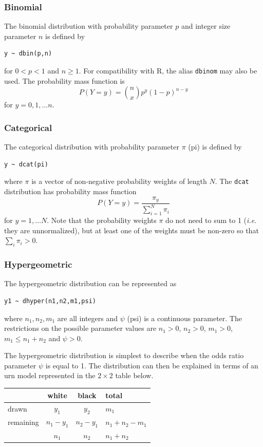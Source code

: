 \documentclass[11pt, a4paper, titlepage]{report}
\begin{document}
\subsubsection{Binomial}
\label{bugs:dbin}

The binomial distribution with probability parameter $p$ and integer
size parameter $n$ is defined by
\begin{verbatim}
y ~ dbin(p,n)
\end{verbatim}
for $0 < p < 1$ and $n \geq 1$. For compatibility with R, the alias
\texttt{dbinom} may also be used. The probability mass function is
\[
P(Y=y) = {n \choose x}  p^y (1-p)^{n-y}
\]
for $y = 0, 1, \ldots n$.

\subsubsection{Categorical}

The categorical distribution with probability parameter $\pi$ (pi) is
defined by
\begin{verbatim}
y ~ dcat(pi)
\end{verbatim}
where $\pi$ is a vector of non-negative probability weights of
length $N$. The \texttt{dcat} distribution has probability mass
function
\[
P(Y=y) = \frac{\pi_y}{\sum_{i=1}^N \pi_i}
\]
for $y = 1, \ldots N$. Note that the probability weights $\pi$ do not
need to sum to 1 ({\em i.e.} they are unnormalized), but at least one
of the weights must be non-zero so that $\sum_i \pi_i > 0$.

\subsubsection{Hypergeometric}
\label{bugs:dhyper}

The hypergeometric distribution can be represented as
\begin{verbatim}
y1 ~ dhyper(n1,n2,m1,psi)
\end{verbatim}
where $n_1, n_2, m_1$ are all integers and $\psi$ (psi) is a continuous
parameter. The restrictions on the possible parameter values are
$n_1 > 0$, $n_2 > 0$, $m_1 > 0$, $m_1 \leq n_1 + n_2$ and $\psi > 0$.

The hypergeometric distribution is simplest to describe when the odds
ratio parameter $\psi$ is equal to 1. The distribution can then be
explained in terms of an urn model represented in the $2 \times 2$
table below.

\begin{center}
\begin{tabular}{l|cc|l}
   & white & black & total \\
  \hline
  drawn    & $y_1$ & $y_2$ & $m_1$ \\
  remaining & $n_1 - y_1$  & $n_2 - y_1$  & $n_1 + n_2 - m_1$ \\
  \hline
  & $n_1$ & $n_2$ & $n_1 + n_2$ \\
\end{tabular}
\end{center}
  
\end{document}
